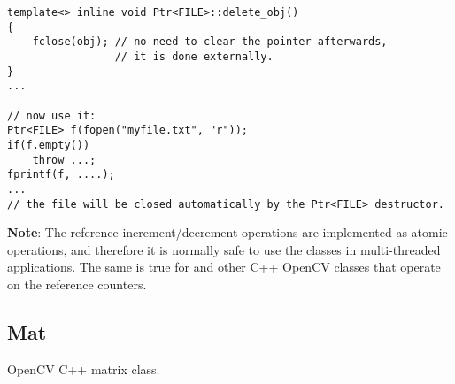 \begin{lstlisting}
template<> inline void Ptr<FILE>::delete_obj()
{
    fclose(obj); // no need to clear the pointer afterwards,
                 // it is done externally.
}
...

// now use it:
Ptr<FILE> f(fopen("myfile.txt", "r"));
if(f.empty())
    throw ...;
fprintf(f, ....);
...
// the file will be closed automatically by the Ptr<FILE> destructor.
\end{lstlisting}  

\textbf{Note}: The reference increment/decrement operations are implemented as atomic operations, and therefore it is normally safe to use the classes in multi-threaded applications. The same is true for  and other C++ OpenCV classes that operate on the reference counters.

\subsection{Mat}\label{Mat}

OpenCV C++ matrix class.

